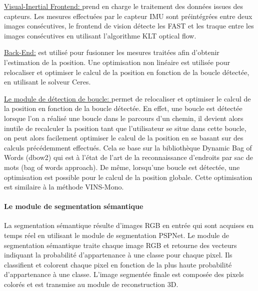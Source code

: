 \documentclass[11pt]{article}
\begin{document}
          \underline{Visual-Inertial Frontend: }
            prend en charge le traitement des données issues des capteurs. Les mesures effectuées par le capteur IMU
            sont préintégrées entre deux images consécutives, le frontend de vision détecte les FAST
            et les traque entre les images consécutives en utilisant l'algorithme KLT optical flow.

          \underline{Back-End:} est utilisé pour fusionner les mesures traitées afin d'obtenir l'estimation de la position. Une optimisation non linéaire
            est utilisée pour relocaliser et optimiser le calcul de la position en fonction de la boucle détectée, en utilisant le solveur Ceres. 

          \underline{Le module de détection de boucle: } permet de relocaliser et optimiser le calcul de la position en fonction de
            la boucle détectée. En effet, une boucle est détectée lorsque l'on a réalisé une boucle dans le parcours d'un chemin, il devient alors inutile
            de recalculer la position tant que l'utilisateur se situe dans cette boucle, on peut alors facilement optimiser le calcul de la position en se 
            basant sur des calculs précédemment effectués. Cela se base sur la bibliothèque Dynamic Bag of Words (\acrshort{dbow2}) qui est à l'état de l'art de la reconnaissance d'endroits 
            par sac de mots (bag of words approach). De même, lorsqu'une boucle est détectée, une optimisation est possible pour le calcul de la position 
            globale. Cette optimisation est similaire à la méthode VINS-Mono.

          \paragraph{Le module de segmentation sémantique}
            La segmentation sémantique résulte d'images RGB en entrée qui sont acquises en temps réel en utilisant le module de segmentation PSPNet. 
            Le module de segmentation sémantique traite chaque image RGB et retourne des vecteurs indiquant la probabilité d'appartenance à une classe
            pour chaque pixel. Ils classifient et colorent chaque pixel en fonction de la plus haute probabilité d'appartenance à une classe. 
            L'image segmentée finale est composée des pixels colorés et est transmise au module de reconstruction 3D.
\end{document}
